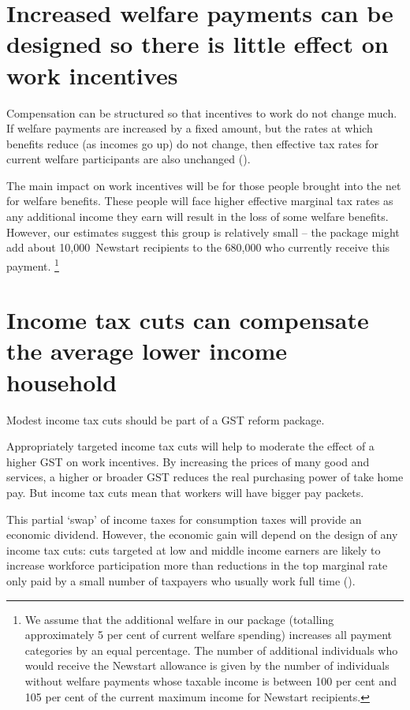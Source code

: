 \section{Increased welfare payments can be designed so there is little effect on work incentives\label{sec:GST-3-3}}
Compensation can be structured so that incentives to work do not change much. If welfare payments are increased by a fixed amount, but the rates at which benefits reduce (as incomes go up) do not change, then effective tax rates for current welfare participants are also unchanged ().

The main impact on work incentives will be for those people brought into the net for welfare benefits. These people will face higher effective marginal tax rates as any additional income they earn will result in the loss of some welfare benefits. However, our estimates suggest this group is relatively small – the package might add about 10,000~Newstart recipients to the 680,000 who currently receive this payment.%
\footnote{We assume that the additional welfare in our package (totalling approximately 5 per cent of current welfare spending) increases all payment categories by an equal percentage. The number of additional individuals who would receive the Newstart allowance is given by the number of individuals without welfare payments whose taxable income is between 100 per cent and 105 per cent of the current maximum income for Newstart recipients.}   

\section{Income tax cuts can compensate the average lower income household\label{sec:GST-3-4}}
Modest income tax cuts should be part of a GST reform package.

Appropriately targeted income tax cuts will help to moderate the effect of a higher GST on work incentives. By increasing the prices of many good and services, a higher or broader GST reduces the real purchasing power of take home pay. But income tax cuts mean that workers will have bigger pay packets. 

This partial ‘swap’ of income taxes for consumption taxes will provide an economic dividend. However, the economic gain will depend on the design of any income tax cuts: cuts targeted at low and middle income earners are likely to increase workforce participation more than reductions in the top marginal rate only paid by a small number of taxpayers who usually work full time (). 

